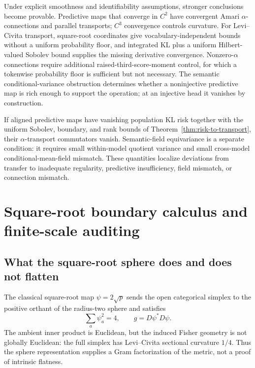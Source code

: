 \documentclass[11pt]{article}
\theoremstyle{definition}
\theoremstyle{remark}
\begin{document}
Under explicit smoothness and identifiability assumptions, stronger conclusions become provable. Predictive maps that converge in $C^2$ have convergent Amari $\alpha$-connections and parallel transports; $C^3$ convergence controls curvature. For Levi--Civita transport, square-root coordinates give vocabulary-independent bounds without a uniform probability floor, and integrated KL plus a uniform Hilbert-valued Sobolev bound supplies the missing derivative convergence. Nonzero-$\alpha$ connections require additional raised-third-score-moment control, for which a tokenwise probability floor is sufficient but not necessary. The semantic conditional-variance obstruction determines whether a noninjective predictive map is rich enough to support the operation; at an injective head it vanishes by construction.

If aligned predictive maps have vanishing population KL risk together with the uniform Sobolev, boundary, and rank bounds of Theorem~\ref{thm:risk-to-transport}, their $\alpha$-transport commutators vanish. Semantic-field equivariance is a separate condition: it requires small within-model quotient variance and small cross-model conditional-mean-field mismatch. These quantities localize deviations from transfer to inadequate regularity, predictive insufficiency, field mismatch, or connection mismatch.

\appendix

\section{Square-root boundary calculus and finite-scale auditing}\label{app:sqrt-audit}

\subsection{What the square-root sphere does and does not flatten}

The classical square-root map $\psi=2\sqrt p$ sends the open categorical simplex to the positive orthant of the radius-two sphere and satisfies
\begin{equation}
    \sum_a\psi_a^2=4,
    \qquad
    g=D\psi^*D\psi.
\end{equation}
The ambient inner product is Euclidean, but the induced Fisher geometry is not globally Euclidean: the full simplex has Levi--Civita sectional curvature $1/4$. Thus the sphere representation supplies a Gram factorization of the metric, not a proof of intrinsic flatness.
\end{document}
